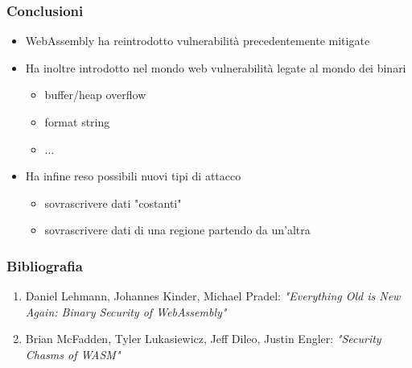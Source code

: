 \documentclass{beamer}
\begin{document}
\begin{frame}
  \frametitle{Conclusioni}
  \begin{itemize}
    \item WebAssembly ha reintrodotto vulnerabilità precedentemente mitigate 
    \pause
    \item Ha inoltre introdotto nel mondo web vulnerabilità legate al mondo dei binari
      \begin{itemize}
        \item buffer/heap overflow
        \item format string
        \item ...
      \end{itemize}
    \pause
    \item Ha infine reso possibili nuovi tipi di attacco
      \begin{itemize}
        \item sovrascrivere dati "costanti"
        \item sovrascrivere dati di una regione partendo da un'altra
      \end{itemize}
  \end{itemize}
\end{frame}

\begin{frame}
  \frametitle{Bibliografia}
  \begin{enumerate}
    \item Daniel Lehmann, Johannes Kinder, Michael Pradel: \emph{"Everything Old is New Again:
      Binary Security of WebAssembly"}
    \item Brian McFadden, Tyler Lukasiewicz, Jeff Dileo, Justin Engler:
      \emph{"Security Chasms of WASM"}
  \end{enumerate}
\end{frame}
\end{document}
